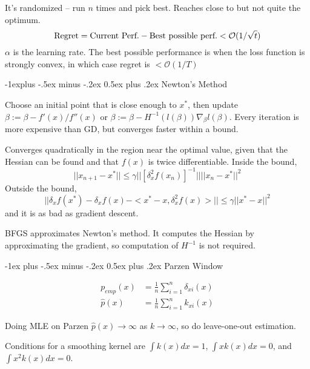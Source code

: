 \documentclass[10pt,landscape]{article}
\makeatletter
\renewcommand{\section}{\@startsection{section}{1}{0mm}%
                                {-1ex plus -.5ex minus -.2ex}%
                                {0.5ex plus .2ex}%
                                {\normalfont\large\bfseries}}
\renewcommand{\subsection}{\@startsection{subsection}{2}{0mm}%
                                {-1explus -.5ex minus -.2ex}%
                                {0.5ex plus .2ex}%
                                {\normalfont\normalsize\bfseries}}
\makeatother
\begin{document}
\begin{multicols}{3}
It's randomized -- run $n$ times and pick best. Reaches close to but not quite the optimum.
\begin{equation*}
\textmd{Regret} = \textmd{Current Perf.} - \textmd{Best possible perf.} < \ensuremath{\mathcal{O}}(1/\sqrt{t})
\end{equation*}
$\alpha$ is the learning rate. The best possible performance is when the loss function is strongly convex, in which case regret is $< \ensuremath{\mathcal{O}}(1/T)$

\subsection{Newton's Method}

Choose an initial point that is close enough to $x^*$, then update $\beta := \beta - f'(x)/f''(x)$ or $\beta := \beta - H^{-1}(l(\beta)) \nabla_\beta l(\beta)$. Every iteration is more expensive than GD, but converges faster within a bound.

Converges quadratically in the region near the optimal value, given that the Hessian can be found and that $f(x)$ is twice differentiable. Inside the bound,
\begin{equation*}
||x_{n + 1} - x^*|| \leq \gamma || \left[ \delta_x^2 f(x_n) \right]^{-1} || ||x_n - x^*||^2
\end{equation*}
Outside the bound,
\begin{equation*}
|| \delta_x f(x^*) - \delta_x f(x) - <x^* - x, \delta_x^2 f(x)> || \leq \gamma ||x^* - x||^2
\end{equation*}
and it is as bad as gradient descent.

BFGS approximates Newton's method. It computes the Hessian by approximating the gradient, so computation of $H^{-1}$ is not required.

\section{Parzen Window}

\begin{align*}
p_{emp}(x) &= \frac{1}{n} \sum_{i = 1}^{n} \delta_{xi}(x)\\
\hat{p}(x) &= \frac{1}{n} \sum_{i = 1}^{n} k_{xi}(x)
\end{align*}

Doing MLE on Parzen $\hat{p}(x) \rightarrow \infty$ as $k \rightarrow \infty$, so do leave-one-out estimation.

Conditions for a smoothing kernel are $\int k(x) dx = 1$, $\int x k(x) dx = 0$, and $\int x^2 k(x) dx = 0$.


\end{multicols}
\end{document}
